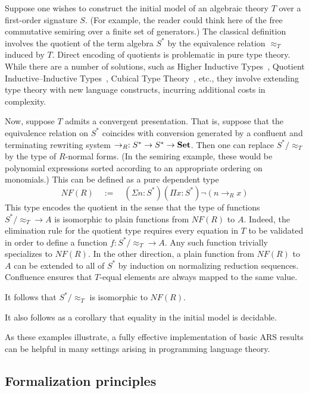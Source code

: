 \begin{example}
Suppose one wishes to construct the initial model of an algebraic theory $T$
over a first-order signature $S$.
(For example, the reader could think here of the free commutative semiring over a finite set of generators.)
The classical definition involves the quotient of the term algebra $S^*$ by
the equivalence relation $\approx_T$ induced by $T$.
Direct encoding of quotients is problematic in pure type theory.
While there are a number of solutions, such as Higher Inductive Types~\cite{HoTT},
Quotient Inductive--Inductive Types~\cite{QIIT}, Cubical Type Theory~\cite{CTT}, etc.,
they involve extending type theory with new language constructs,
incurring additional costs in complexity.

Now, suppose $T$ admits a convergent presentation.
That is, suppose that the equivalence relation on $S^*$ coincides
with conversion generated by a confluent and terminating rewriting system
$\to_R : S^* \to S^* \to \mathbf{Set}$.
Then one can replace $S^*/{\approx_T}$ by the type of $R$-normal forms.
(In the semiring example, these would be polynomial expressions sorted according to
an appropriate ordering on monomials.)
This can be defined as a pure dependent type
\[ NF(R) \quad := \quad (\Sigma n : S^*) (\Pi x : S^*) \lnot (n \to_R x) \]
This type encodes the quotient in the sense that the type of functions $S^*/{\approx_T} \to A$ is isomorphic to plain functions from $NF(R)$ to $A$.
Indeed, the elimination rule for the quotient type requires every equation in $T$
to be validated in order to define a function $f : S^*/{\approx_T} \to A$.
Any such function trivially specializes to $NF(R)$.  In the other direction,
a plain function from $NF(R)$ to $A$
can be extended to all of $S^*$ by induction on normalizing reduction sequences.
Confluence ensures that $T$-equal elements are always mapped to the same value.

It follows that $S^*/{\approx_T}$ is isomorphic to $NF(R)$.

It also follows as a corollary that equality in the initial model is decidable.
\end{example}

As these examples illustrate, a fully effective implementation of basic ARS results
can be helpful in many settings arising in programming language theory.

\subsection{Formalization principles}

